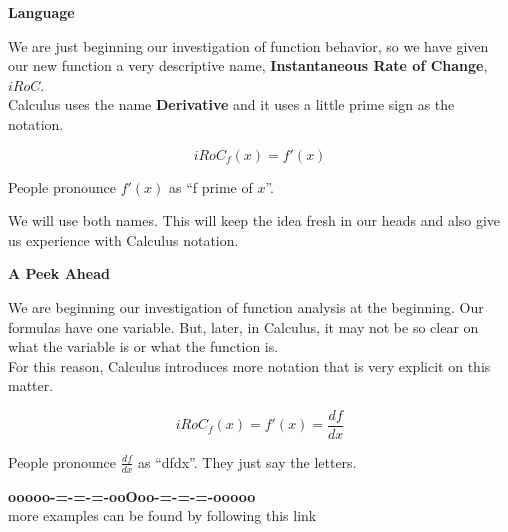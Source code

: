 \documentclass{ximera}
\begin{document}
\begin{notation} \textbf{\textcolor{blue!55!black}{Language}} 


We are just beginning our investigation of function behavior, so we have given our new function a very descriptive name, \textbf{\textcolor{blue!55!black}{Instantaneous Rate of Change}},  \textbf{\textcolor{blue!55!black}{$iRoC$}}. \\


Calculus uses the name \textbf{\textcolor{blue!55!black}{Derivative}} and it uses a little prime sign as the notation.



\[
iRoC_f(x) = f'(x)
\]


People pronounce $f'(x)$ as ``f prime of $x$''.


\end{notation}

We will use both names.  This will keep the idea fresh in our heads and also give us experience with Calculus notation.






\begin{notation} \textbf{\textcolor{red!70!black}{A Peek Ahead}}


We are beginning our investigation of function analysis at the beginning.  Our formulas have one variable.  But, later, in Calculus, it may not be so clear on what the variable is or what the function is. \\

For this reason, Calculus introduces more notation that is very explicit on this matter.



\[
iRoC_f(x) = f'(x) = \frac{df}{dx}
\]


People pronounce $\frac{df}{dx}$ as ``dfdx''.  They just say the letters.


\end{notation}





























\begin{onlineOnly}
\begin{center}
\textbf{\textcolor{green!50!black}{ooooo-=-=-=-ooOoo-=-=-=-ooooo}} \\

more examples can be found by following this link\\ 

\end{center}
\end{onlineOnly}
\end{document}
